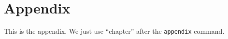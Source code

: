 \chapter{Appendix}

This is the appendix. We just use ``chapter'' after the \texttt{appendix} command.